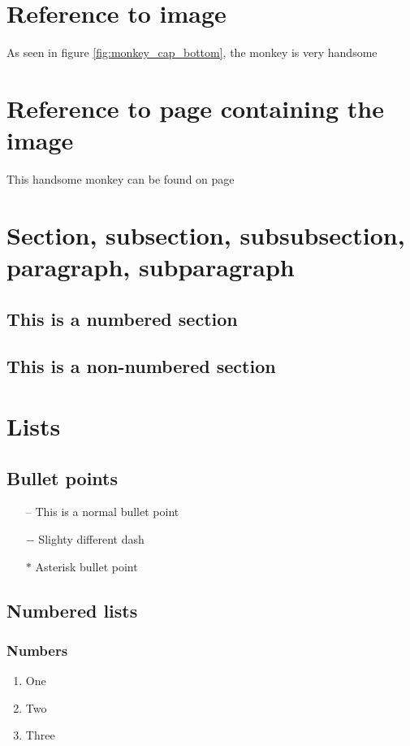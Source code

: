\documentclass[a4paper]{report}
\begin{document}
\chapter{Reference to image}
As seen in figure \ref{fig:monkey_cap_bottom}, the monkey is very handsome
\chapter{Reference to page containing the image}
This handsome monkey can be found on page \pageref{fig:comparison_of-monkeys}
\chapter{Section, subsection, subsubsection, paragraph, subparagraph}
    \section{This is a numbered section}
    \section*{This is a non-numbered section}
    
\chapter{Lists}
    \section{Bullet points}
        \begin{itemize}
            \item[--] This is a normal bullet point
            \item[$-$] Slighty different dash
            \item[$\ast$] Asterisk bullet point
        \end{itemize}
    \section{Numbered lists}
        \subsection{Numbers} 
            \begin{enumerate}[label=\arabic*)]
                \item One
                \item Two
                \item Three
            \end{enumerate}
\end{document}

